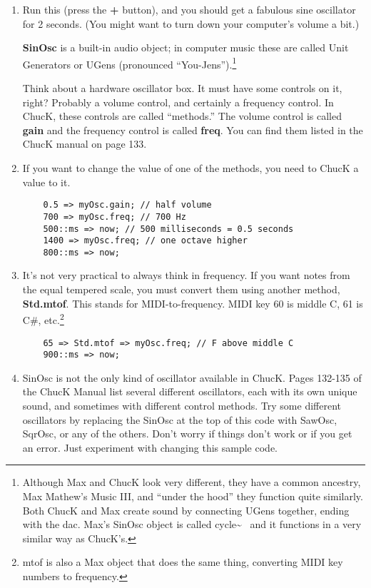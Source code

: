 \documentclass{article}
\begin{document}
\begin{enumerate}
In ChucK you must explicitly specify how long to generate sound. Let's make it last 2 seconds:

\begin{lstlisting}
	2::second => now; // <-- notice the 2 colons
\end{lstlisting}

\item Run this (press the \textbf{+} button), and you should get a fabulous
sine oscillator for 2 seconds. (You might want to turn down your computer's volume a bit.)

\textbf{SinOsc} is a built-in audio object; in computer music these are called Unit Generators or UGens (pronounced ``You-Jens'').\footnote{Although Max and ChucK look very different, they have a common ancestry, Max Mathew's Music III, and ``under the hood'' they function quite similarly. Both ChucK and Max create sound by connecting UGens together, ending with the dac. Max's SinOsc object is called cycle\~~ and it functions in a very similar way as ChucK's.}

Think about a hardware oscillator box. It must have some controls on it,
right? Probably a volume control, and certainly a frequency control. In ChucK, these controls are called ``methods.'' The volume control is called \textbf{gain} and the frequency control is called \textbf{freq}. You can find them listed in the ChucK manual on page 133.

\item If you want to change the value of one of the methods, you need to ChucK a value to it.

\begin{lstlisting}
	0.5 => myOsc.gain; // half volume
	700 => myOsc.freq; // 700 Hz
	500::ms => now; // 500 milliseconds = 0.5 seconds
	1400 => myOsc.freq; // one octave higher
	800::ms => now;
\end{lstlisting}

\item It's not very practical to always think in frequency. If you want notes from the equal tempered scale, you must convert them using another method, \textbf{Std.mtof}. This stands for MIDI-to-frequency. MIDI key 60 is middle C, 61 is C\#, etc.\footnote{mtof is also a Max object that does the same thing, converting MIDI key numbers to frequency.}

\begin{lstlisting}
	65 => Std.mtof => myOsc.freq; // F above middle C
	900::ms => now;
\end{lstlisting}

\item SinOsc is not the only kind of oscillator available in ChucK. Pages 132-135 of the ChucK Manual list several different oscillators, each with its own unique sound, and sometimes with different control methods. Try some different oscillators by replacing the SinOsc at the top of this code with SawOsc, SqrOsc, or any of the others. Don't worry if things don't work or if you get an error. Just experiment with changing this sample code.

\end {enumerate}
\end{document}
